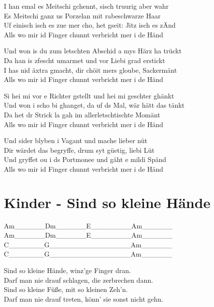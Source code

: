 \documentclass[
  letterpaper,
]{scrbook}
\begin{document}
I han emal es Meitschi gchennt, s\textquotesingle isch truurig aber
wahr\\
Es Meitschi ganz us Porzelan mit rabeschwarze Haar\\
Uf einisch isch es zue mer cho, het gseit: Jitz isch es
z\textquotesingle Änd\\
Alls wo mir id Finger chunnt verbricht mer i de Händ

Und won i\textquotesingle s du zum letschten Abschid a mys Härz ha
trückt\\
Da han i\textquotesingle s z\textquotesingle fescht umarmet und vor
Liebi grad erstickt\\
I has nid äxtra gmacht, dir chöit mers gloube, Sackermänt\\
Alls wo mir id Finger chunnt verbricht mer i de Händ

Si hei mi vor e Richter gstellt und hei mi geschter ghänkt\\
Und won i scho bi ghanget, da uf ds Mal, wär hätt das tänkt\\
Da het dr Strick la gah im allerletschtischte Momänt\\
Alls wo mir id Finger chunnt verbricht mer i de Händ

Und sider blyben i Vagant und mache lieber nüt\\
Dir wärdet das begryffe, drum syt güetig, liebi Lüt\\
Und gryffet ou i ds Portmonee und gäht e mildi Spänd\\
Alls wo mir id Finger chunnt verbricht mer i de Händ

\hypertarget{kinder---sind-so-kleine-huxe4nde}{%
\chapter{Kinder - Sind so kleine
Hände}\label{kinder---sind-so-kleine-huxe4nde}}

Am\_\_\_\_\_\_\textbar Dm\_\_\_\_\_\_\textbar E\_\_\_\_\_\_\_\_\textbar Am\_\_\_\_\_\_\textbar{}\\
Am\_\_\_\_\_\_\textbar Dm\_\_\_\_\_\_\textbar E\_\_\_\_\_\_\_\_\textbar Am\_\_\_\_\_\_\textbar{}\\
C\_\_\_\_\_\_\_\textbar G\_\_\_\_\_\_\_\textbar\_\_\_\_\_\_\_\_\_\textbar Am\_\_\_\_\_\_\textbar{}\\
C\_\_\_\_\_\_\_\textbar G\_\_\_\_\_\_\_\textbar\_\_\_\_\_\_\_\_\_\textbar Am\_\_\_\_\_\_\textbar{}

Sind so kleine Hände, winz'ge Finger dran.\\
Darf man nie drauf schlagen, die zerbrechen dann.\\
Sind so kleine Füße, mit so kleinen Zeh'n.\\
Darf man nie drauf treten, könn' sie sonst nicht gehn.
\end{document}
